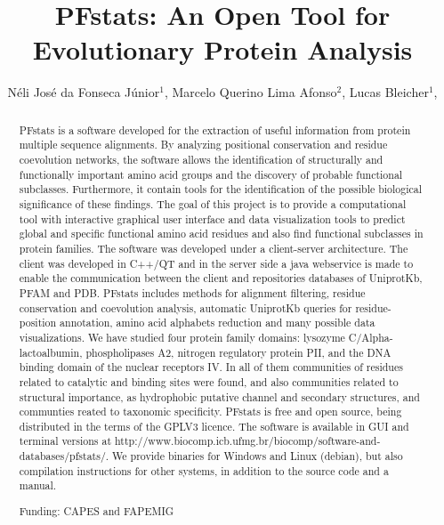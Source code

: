 \documentclass[twoside]{article}
\title{\vspace{-15mm}\fontsize{24pt}{10pt}\selectfont\textbf{ PFstats: An Open Tool for Evolutionary Protein Analysis }} %
\author{ Néli José da Fonseca Júnior$^{1}$, Marcelo Querino Lima Afonso$^{2}$, Lucas Bleicher$^{1}$, }
\affil{ 1 Federal University of Minas Gerais

2 UFMG

 }
\date{}
\begin{document}
  
  
  \maketitle %
  
  
  \thispagestyle{fancy} %
  
  
  \begin{abstract}
  PFstats is a software developed for the extraction of useful information from protein multiple sequence alignments. By analyzing positional conservation and residue coevolution networks, the software allows the identification of structurally and functionally important amino acid groups and the discovery of probable functional subclasses. Furthermore, it contain tools for the identification of the possible biological significance of these findings. The goal of this project is to provide a computational tool with interactive graphical user interface and data visualization tools to predict global and specific functional amino acid residues and also find functional subclasses in protein families. The software was developed under a client-server architecture. The client was developed in C++/QT and in the server side a java webservice is made to enable the communication between the client and repositories databases of UniprotKb, PFAM and PDB. PFstats includes methods for alignment filtering, residue conservation and coevolution analysis, automatic UniprotKb queries for residue-position annotation, amino acid alphabets reduction and many possible data visualizations. We have studied four protein family domains: lysozyme C/Alpha-lactoalbumin, phospholipases A2, nitrogen regulatory protein PII, and the DNA binding domain of the nuclear receptors IV. In all of them communities of residues related to catalytic and binding sites were found, and also communities related to structural importance, as hydrophobic putative channel and secondary structures, and communties reated to taxonomic specificity. PFstats is free and open source, being distributed in the terms of the GPLV3 licence. The software is available in GUI and terminal versions at http://www.biocomp.icb.ufmg.br/biocomp/software-and-databases/pfstats/. We provide binaries for Windows and Linux (debian), but also compilation instructions for other systems, in addition to the source code and a manual.
  
  Funding: CAPES and FAPEMIG \\ 
  \end{abstract}
  
\end{document}
